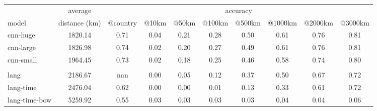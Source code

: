 
\begin{tabular}{l|c|cccccccc}
& average &\multicolumn{8}{c}{accuracy} \\
model & distance (km) & @country & @10km & @50km & @100km & @500km & @1000km & @2000km & @3000km \\
\hline
 cnn-huge & 1820.14 & 0.71 & 0.04 & 0.21 & 0.28 & 0.50 & 0.61 & 0.76 & 0.81 \\
 cnn-large & 1826.98 & 0.74 & 0.02 & 0.20 & 0.27 & 0.49 & 0.61 & 0.76 & 0.81 \\
 cnn-small & 1964.45 & 0.73 & 0.02 & 0.18 & 0.25 & 0.46 & 0.58 & 0.74 & 0.80 \\
\\
 lang & 2186.67 & nan & 0.00 & 0.05 & 0.12 & 0.37 & 0.50 & 0.67 & 0.72 \\
 lang-time & 2476.04 & 0.62 & 0.00 & 0.00 & 0.01 & 0.13 & 0.33 & 0.61 & 0.72 \\
 lang-time-bow & 5259.92 & 0.55 & 0.03 & 0.03 & 0.03 & 0.03 & 0.04 & 0.04 & 0.06 \\
 \end{tabular}
